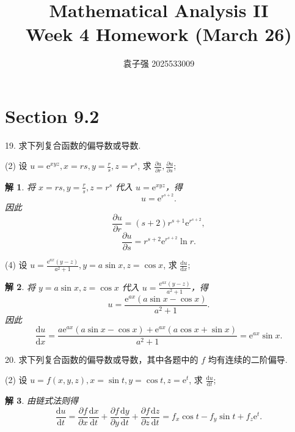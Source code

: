 \documentclass[a4paper,12pt]{article}
\title{Mathematical Analysis II\\Week 4 Homework (March 26)}
\author{袁子强\hspace{1cm} 2025533009}
\newtheorem*{sol}{解}
\begin{document}
\maketitle

\section*{Section 9.2}

19. 求下列复合函数的偏导数或导数.

(2) 设 $u = \mathrm{e}^{xyz}, x = rs, y = \frac{r}{s}, z = r^s$, 求 $\frac{\partial u}{\partial r}, \frac{\partial u}{\partial s}$;
\begin{sol}
    将 $x = rs, y = \frac{r}{s}, z = r^s$ 代入 $u = \mathrm{e}^{xyz}$，得
    $$
        u = \mathrm{e}^{r^{s+2}}.
    $$
    因此
    $$
        \frac{\partial u}{\partial r} = (s+2)r^{s+1}\mathrm{e}^{r^{s+2}},
    $$
    $$
        \frac{\partial u}{\partial s} = r^{s+2}\mathrm{e}^{r^{s+2}} \ln r.
    $$
\end{sol}

(4) 设 $u = \frac{\mathrm{e}^{ax}(y-z)}{a^2+1}, y = a\sin x, z = \cos x$, 求 $\frac{\mathrm{d}u}{\mathrm{d}x}$;
\begin{sol}
    将 $y = a\sin x, z = \cos x$ 代入 $u = \frac{\mathrm{e}^{ax}(y-z)}{a^2+1}$，得
    $$
        u = \frac{\mathrm{e}^{ax}(a\sin x-\cos x)}{a^2+1}.
    $$
    因此
    $$
        \frac{\mathrm{d}u}{\mathrm{d}x}
        = \frac{a\mathrm{e}^{ax}(a\sin x-\cos x) + \mathrm{e}^{ax}(a\cos x+\sin x)}{a^2+1}
        = \mathrm{e}^{ax}\sin x.
    $$
\end{sol}


20. 求下列复合函数的偏导数或导数，其中各题中的 $f$ 均有连续的二阶偏导.

(2) 设 $u = f(x,y,z), x = \sin t, y = \cos t, z = \mathrm{e}^t$, 求 $\frac{\mathrm{d}u}{\mathrm{d}t}$;
\begin{sol}
    由链式法则得
    $$
        \frac{\mathrm{d}u}{\mathrm{d}t}
        = \frac{\partial f}{\partial x}\frac{\mathrm{d}x}{\mathrm{d}t}
        + \frac{\partial f}{\partial y}\frac{\mathrm{d}y}{\mathrm{d}t}
        + \frac{\partial f}{\partial z}\frac{\mathrm{d}z}{\mathrm{d}t}
        = f_x \cos t - f_y \sin t + f_z \mathrm{e}^t.
    $$
\end{sol}
\end{document}
